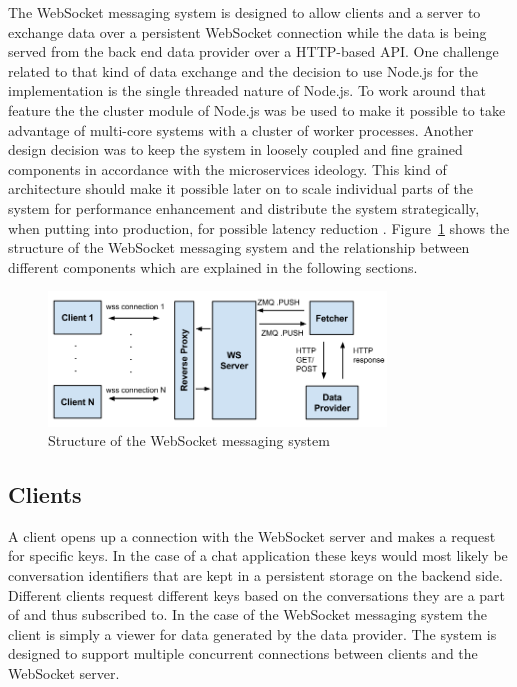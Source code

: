 The WebSocket messaging system is designed to allow clients and a server to exchange data over a persistent WebSocket connection while the data is being served from the back end data provider over a HTTP-based API. One challenge related to that kind of data exchange and the decision to use Node.js for the implementation is the single threaded nature of Node.js. To work around that feature the the cluster module of Node.js was be used to make it possible to take advantage of multi-core systems with a cluster of worker processes. Another design decision was to keep the system in loosely coupled and fine grained components in accordance with the microservices ideology. This kind of architecture should make it possible later on to scale individual parts of the system for performance enhancement and distribute the system strategically, when putting into production, for possible latency reduction \cite{tilkovMicroservices}. Figure~\ref{fig:webSocketMessagingSystem} shows the structure of the WebSocket messaging system and the relationship between different components which are explained in the following sections.
\\
\begin{figure}[h!]
	\centering
	\includegraphics[width=0.8\textwidth]{images/websocketMessagingSystem}
	\caption{Structure of the WebSocket messaging system}
	\label{fig:webSocketMessagingSystem}
\end{figure}

\subsection{Clients}

A client opens up a connection with the WebSocket server and makes a request for specific keys. In the case of a chat application these keys would most likely be conversation identifiers that are kept in a persistent storage on the backend side. Different clients request different keys based on the conversations they are a part of and thus subscribed to. In the case of the WebSocket messaging system the client is simply a viewer for data generated by the data provider. The system is designed to support multiple concurrent connections between clients and the WebSocket server.

